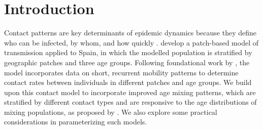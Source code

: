 \section{Introduction}\label{intro}
Contact patterns are key determinants of epidemic dynamics
because they define who can be infected, by whom, and how quickly \cite{Mossong2008}.
\citet{Arenas2020} develop a patch-based model of \sarscovii transmission applied to Spain,
in which the modelled population is stratified by geographic patches and three age groups.
Following foundational work by \citet{Sattenspiel1995,Balcan2011,Gomez-Gardenes2018},
the model incorporates data on short, recurrent mobility patterns
to determine contact rates between individuals in different patches and age groups.
We build upon this contact model to incorporate improved age mixing patterns,
which are stratified by different contact types and are responsive to
the age distributions of mixing populations, as proposed by \citet{Arregui2018}.
We also explore some practical considerations in parameterizing such models.
